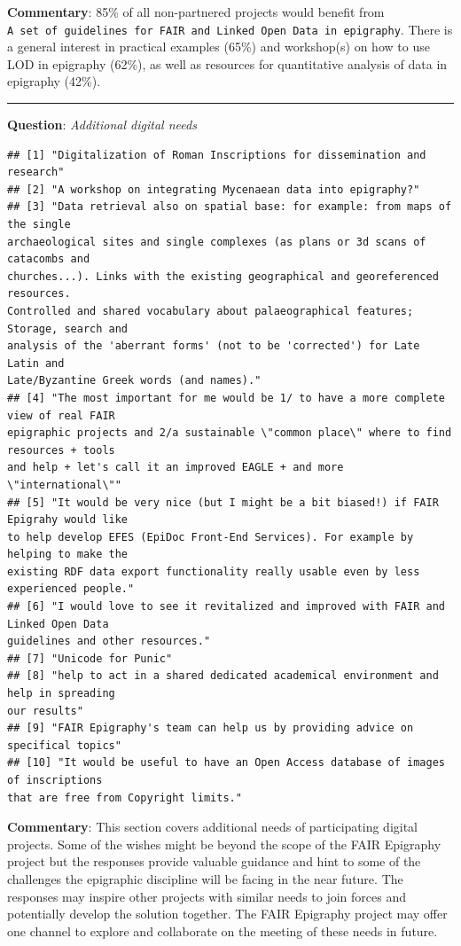 \documentclass[
  12pt,
]{scrreprt}
\begin{document}
\normalsize

\textbf{Commentary}: 85\% of all non-partnered projects would benefit
from
\texttt{A\ set\ of\ guidelines\ for\ FAIR\ and\ Linked\ Open\ Data\ in\ epigraphy}.
There is a general interest in practical examples (65\%) and workshop(s)
on how to use LOD in epigraphy (62\%), as well as resources for
quantitative analysis of data in epigraphy (42\%).

\begin{center}\rule{0.5\linewidth}{0.5pt}\end{center}

\textbf{Question}: \emph{Additional digital needs}

\footnotesize

\begin{verbatim}
## [1] "Digitalization of Roman Inscriptions for dissemination and research"
## [2] "A workshop on integrating Mycenaean data into epigraphy?"
## [3] "Data retrieval also on spatial base: for example: from maps of the single
archaeological sites and single complexes (as plans or 3d scans of catacombs and
churches...). Links with the existing geographical and georeferenced resources.
Controlled and shared vocabulary about palaeographical features; Storage, search and
analysis of the 'aberrant forms' (not to be 'corrected') for Late Latin and
Late/Byzantine Greek words (and names)."
## [4] "The most important for me would be 1/ to have a more complete view of real FAIR
epigraphic projects and 2/a sustainable \"common place\" where to find resources + tools
and help + let's call it an improved EAGLE + and more \"international\""
## [5] "It would be very nice (but I might be a bit biased!) if FAIR Epigrahy would like
to help develop EFES (EpiDoc Front-End Services). For example by helping to make the
existing RDF data export functionality really usable even by less experienced people."
## [6] "I would love to see it revitalized and improved with FAIR and Linked Open Data
guidelines and other resources."
## [7] "Unicode for Punic"
## [8] "help to act in a shared dedicated academical environment and help in spreading
our results"
## [9] "FAIR Epigraphy's team can help us by providing advice on specifical topics"
## [10] "It would be useful to have an Open Access database of images of inscriptions
that are free from Copyright limits."
\end{verbatim}

\normalsize

\textbf{Commentary}: This section covers additional needs of
participating digital projects. Some of the wishes might be beyond the
scope of the FAIR Epigraphy project but the responses provide valuable
guidance and hint to some of the challenges the epigraphic discipline
will be facing in the near future. The responses may inspire other
projects with similar needs to join forces and potentially develop the
solution together. The FAIR Epigraphy project may offer one channel to
explore and collaborate on the meeting of these needs in future.
\end{document}
